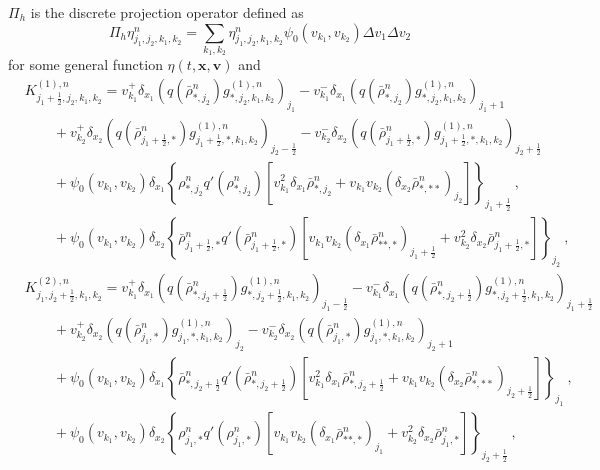 \documentclass[review,onefignum,onetabnum]{siamart220329}
\begin{document}
$\Pi_h$ is the discrete projection operator defined as 
\begin{equation*}
    \Pi_h \eta_{j_1,j_2,k_1,k_2}^n = \sum_{k_1,k_2}\eta_{j_1,j_2,k_1,k_2}^n \psi_{0}(v_{k_1},v_{k_2})\Delta v_1 \Delta v_2
\end{equation*} 
for some general function $\eta(t,\mathbf{x},\mathbf{v})$ and 
\begin{align*}
    & K_{j_1+\frac12,j_2,k_1, k_2}^{(1),n}  = v_{k_1}^+\delta_{x_1}(q( {\bar{\rho}}_{*,j_2}^n) g_{*,j_2,k_1,k_2}^{(1),n})_{j_1} - v_{k_1}^-\delta_{x_1}(q( {\bar{\rho}}_{*,j_2}^n) g_{*,j_2,k_1,k_2}^{(1),n})_{j_1+1}\\
    & \qquad + v_{k_2}^+\delta_{x_2}(q( {\bar{\rho}}_{j_1+\frac12,*}^n) g_{j_1+\frac12, *,k_1,k_2}^{(1),n})_{j_2-\frac12} - v_{k_2}^-\delta_{x_2}(q( {\bar{\rho}}_{j_1+\frac12,*}^n) g_{j_1+\frac12,*,k_1,k_2}^{(1),n})_{j_2+\frac12} \\
    &\qquad + \psi_{0}(v_{k_1}, v_{k_2})\delta_{x_1}\left\{ {\rho}_{*,j_2}^n q'( {\rho}_{*,j_2}^n)\left[v_{k_1}^2\delta_{x_1}\bar{\rho}_{*,j_2}^n + v_{k_1}v_{k_2}(\delta_{x_2}\bar{\rho}_{*,**}^n)_{j_2} \right]\right\}_{j_1+\frac12}\ , \\
    &\qquad + \psi_{0}(v_{k_1}, v_{k_2})\delta_{x_2}\left\{ {\bar{\rho}}_{j_1+\frac12,*}^n q'( {\bar{\rho}}_{j_1+\frac12,*}^n)\left[v_{k_1}v_{k_2}(\delta_{x_1}\bar{\rho}_{**,*}^n)_{j_1+\frac12} + v_{k_2}^2 \delta_{x_2}\bar{\rho}_{j_1+\frac12,*}^n\right]\right\}_{j_2}\ , \\
    & K_{j_1,j_2+\frac12,k_1, k_2}^{(2),n}  = v_{k_1}^+\delta_{x_1}(q( {\bar{\rho}}_{*,j_2+\frac12}^n) g_{*,j_2+\frac12,k_1,k_2}^{(1),n})_{j_1-\frac12} - v_{k_1}^-\delta_{x_1}(q( {\bar{\rho}}_{*,j_2+\frac12}^n) g_{*,j_2+\frac12,k_1,k_2}^{(1),n})_{j_1+\frac12}\\
    & \qquad + v_{k_2}^+\delta_{x_2}(q( {\bar{\rho}}_{j_1,*}^n) g_{j_1, *,k_1,k_2}^{(1),n})_{j_2} - v_{k_2}^-\delta_{x_2}(q( {\bar{\rho}}_{j_1,*}^n) g_{j_1,*,k_1,k_2}^{(1),n})_{j_2+1} \\
    &\qquad + \psi_{0}(v_{k_1}, v_{k_2})\delta_{x_1}\left\{ {\bar{\rho}}_{*,j_2+\frac12}^n q'( {\bar{\rho}}_{*,j_2+\frac12}^n)\left[v_{k_1}^2\delta_{x_1}\bar{\rho}_{*,j_2+\frac12}^n + v_{k_1}v_{k_2}(\delta_{x_2}\bar{\rho}_{*,**}^n)_{j_2+\frac12} \right]\right\}_{j_1}\ , \\
    &\qquad + \psi_{0}(v_{k_1}, v_{k_2})\delta_{x_2}\left\{ {\rho}_{j_1,*}^n q'( {\rho}_{j_1,*}^n)\left[v_{k_1}v_{k_2}(\delta_{x_1}\bar{\rho}_{**,*}^n)_{j_1} + v_{k_2}^2 \delta_{x_2}\bar{\rho}_{j_1,*}^n \right]\right\}_{j_2+\frac12}\ , \\

\end{align*}
\end{document}
